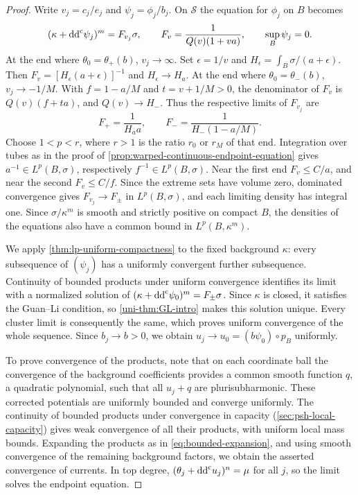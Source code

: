\begin{proof}
Write $v_j=c_j/e_j$ and $\psi_j=\phi_j/b_j$. On $\mathscr S$ the equation for $\phi_j$ on $B$ becomes
\[
 (\kappa+\mathrm{dd}^{\mathrm{c}}\psi_j)^m=F_{v_j}\sigma,
 \qquad F_v=\frac1{Q(v)(1+va)},\qquad\sup_B\psi_j=0.
\]
At the end where $\theta_0=\theta_+(b)$, $v_j\to\infty$. Set $\epsilon=1/v$ and $H_\epsilon=\int_B\sigma/(a+\epsilon)$. Then $F_v=[H_\epsilon(a+\epsilon)]^{-1}$ and $H_\epsilon\to H_a$. At the end where $\theta_0=\theta_-(b)$, $v_j\to-1/M$. With $f=1-a/M$ and $t=v+1/M>0$, the denominator of $F_v$ is $Q(v)(f+ta)$, and $Q(v)\to H_-$. Thus the respective limits of $F_{v_j}$ are
\[
 F_+=\frac1{H_a a},\qquad F_-=\frac1{H_-(1-a/M)}.
\]
Choose $1<p<r$, where $r>1$ is the ratio $r_0$ or $r_M$ of that end. Integration over tubes as in the proof of \cref{prop:warped-continuous-endpoint-equation} gives $a^{-1}\in L^p(B,\sigma)$, respectively $f^{-1}\in L^p(B,\sigma)$. Near the first end $F_v\leq C/a$, and near the second $F_v\leq C/f$. Since the extreme sets have volume zero, dominated convergence gives $F_{v_j}\to F_\pm$ in $L^p(B,\sigma)$, and each limiting density has integral one. Since $\sigma/\kappa^m$ is smooth and strictly positive on compact $B$, the densities of the equations also have a common bound in $L^p(B,\kappa^m)$.

We apply \cref{thm:lp-uniform-compactness} to the fixed background $\kappa$: every subsequence of $(\psi_j)$ has a uniformly convergent further subsequence. Continuity of bounded products under uniform convergence identifies its limit with a normalized solution of $(\kappa+\mathrm{dd}^{\mathrm{c}}\psi_0)^m=F_\pm\sigma$. Since $\kappa$ is closed, it satisfies the Guan--Li condition, so \cref{uni-thm:GL-intro} makes this solution unique. Every cluster limit is consequently the same, which proves uniform convergence of the whole sequence. Since $b_j\to b>0$, we obtain $u_j\to u_0=(b\psi_0)\circ p_B$ uniformly.

To prove convergence of the products, note that on each coordinate ball the convergence of the background coefficients provides a common smooth function $q$, a quadratic polynomial, such that all $u_j+q$ are plurisubharmonic. These corrected potentials are uniformly bounded and converge uniformly. The continuity of bounded products under convergence in capacity (\cref{sec:psh-local-capacity}) gives weak convergence of all their products, with uniform local mass bounds. Expanding the products as in \eqref{eq:bounded-expansion}, and using smooth convergence of the remaining background factors, we obtain the asserted convergence of currents. In top degree, $(\theta_j+\mathrm{dd}^{\mathrm{c}} u_j)^n=\mu$ for all $j$, so the limit solves the endpoint equation.


\end{proof}
